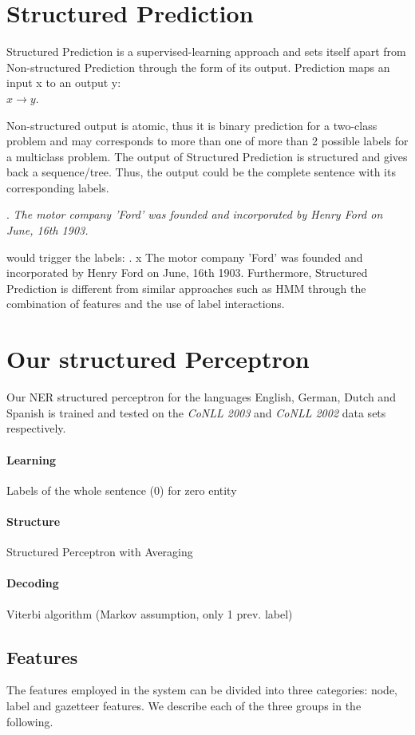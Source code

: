 \documentclass[11pt]{article}
\begin{document}
\section{Structured Prediction}
Structured Prediction \cite{strlearn} 
is a supervised-learning approach and sets itself apart from Non-structured Prediction through the form of its output. 
Prediction maps an input x to an output y: \\
$ x \rightarrow y $. 

Non-structured output is atomic, thus it is binary prediction for a two-class problem and may corresponds to more than one of more than 2 possible labels for a 
multiclass problem. 
The output of Structured Prediction is structured and gives back a sequence/tree. 
Thus, the output could be the complete sentence with its corresponding labels. 

\ex. \emph{The motor company 'Ford' was founded and incorporated  by Henry Ford on June, 16th 1903.} \label{PredEx1a}

would trigger the labels: 
\ex. x The motor company 'Ford' was founded and incorporated  by Henry Ford on June, 16th 1903. \label{PredEx1b} %
Furthermore, Structured Prediction is different from similar approaches such as HMM through the combination of features and the use of label interactions.


\section{Our structured Perceptron}
Our NER structured perceptron for the languages English, German, Dutch and Spanish is trained and tested on the \emph{CoNLL 2003} and \emph{CoNLL 2002} data sets
respectively. 

\paragraph*{Learning}
Labels of the whole sentence (0) for zero entity
\paragraph*{Structure}
Structured Perceptron with Averaging

\paragraph*{Decoding}
Viterbi algorithm (Markov assumption, only 1 prev.
label)

\subsection*{Features}
The features employed in the system can be divided into three categories: node, label and gazetteer features. 
We describe each of the three groups in the following.
\end{document}
